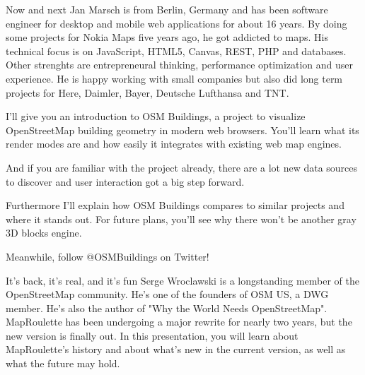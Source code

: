 %
{Now and next}%
{Jan Marsch is from Berlin, Germany and has been software engineer for desktop and mobile web applications for about 16 years. By doing some projects for Nokia Maps five years ago, he got addicted to maps. His technical focus is on JavaScript, HTML5, Canvas, REST, PHP and databases. Other strenghts are entrepreneural thinking, performance optimization and user experience. He is happy working with small companies but also did long term projects for Here, Daimler, Bayer, Deutsche Lufthansa and TNT.}%
{I'll give you an introduction to OSM Buildings, a project to visualize OpenStreetMap building geometry in modern web browsers.
You'll learn what its render modes are and how easily it integrates with existing web map engines.

And if you are familiar with the project already, there are a lot new data sources to discover and user interaction got a big step forward.

Furthermore I’ll explain how OSM Buildings compares to similar projects and where it stands out. For future plans, you'll see why there won't be another gray 3D blocks engine.

Meanwhile, follow @OSMBuildings on Twitter!}


%
{It's back, it's real, and it's fun}%
{Serge Wroclawski is a longstanding member of the OpenStreetMap community. He's one of the founders of OSM US, a DWG member. He's also the author of "Why the World Needs OpenStreetMap".}%
{MapRoulette has been undergoing a major rewrite for nearly two years, but the new version is finally out. In this presentation, you will learn about MapRoulette's history and about what's new in the current version, as well as what the future may hold.}

